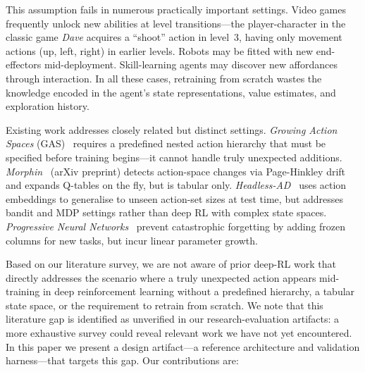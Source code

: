 \documentclass{article}
\begin{document}
This assumption fails in numerous practically important settings. Video games
frequently unlock new abilities at level transitions---the player-character in
the classic game \textit{Dave} acquires a ``shoot'' action in level~3, having
only movement actions (up, left, right) in earlier levels. Robots may be fitted
with new end-effectors mid-deployment. Skill-learning agents may discover new
affordances through interaction. In all these cases, retraining from scratch
wastes the knowledge encoded in the agent's state representations, value
estimates, and exploration history.

Existing work addresses closely related but distinct settings. \emph{Growing
Action Spaces} (GAS)~\cite{farquhar2020growing} requires a predefined nested
action hierarchy that must be specified before training begins---it cannot
handle truly unexpected additions. \emph{Morphin}~\cite{delarosa2026morphin}
(arXiv preprint) detects action-space changes via Page-Hinkley drift and
expands Q-tables on the fly, but is tabular only. \emph{Headless-AD}~
\cite{sinii2023headless} uses action embeddings to generalise to unseen
action-set sizes at test time, but addresses bandit and MDP settings rather
than deep RL with complex state spaces. \emph{Progressive Neural
Networks}~\cite{rusu2016progressive} prevent catastrophic forgetting by adding
frozen columns for new tasks, but incur linear parameter growth.

Based on our literature survey, we are not aware of prior deep-RL work that
directly addresses the scenario where a truly unexpected action appears
mid-training in deep reinforcement learning without a predefined hierarchy, a
tabular state space, or the requirement to retrain from scratch. We note that
this literature gap is identified as unverified in our research-evaluation
artifacts: a more exhaustive survey could reveal relevant work we have not yet
encountered. In this paper we present a design artifact---a reference
architecture and validation harness---that targets this gap. Our contributions
are:
\end{document}
